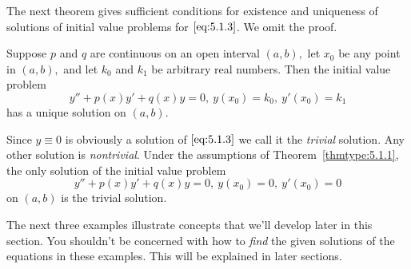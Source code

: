 \documentclass{ximera}
\begin{document}
The next theorem gives sufficient conditions for existence and
uniqueness of solutions of initial value problems for $\eqref{eq:5.1.3}$. We
omit the proof.
 
\begin{theorem} \label{thmtype:5.1.1}
Suppose $p$ and $q$ are continuous on an open interval $(a,b),$
let $x_0$ be any point in $(a,b),$ and let $k_0$ and $k_1$ be
arbitrary real numbers. Then the initial value problem
$$
y''+p(x)y'+q(x)y=0,\ y(x_0)=k_0,\ y'(x_0)=k_1
$$
 has a unique solution  on $(a,b)$.
\end{theorem}
 
Since $y\equiv0$ is obviously a solution of $\eqref{eq:5.1.3}$ we call it
the \textit{trivial} solution. Any other solution is \textit{nontrivial}.
Under the assumptions of Theorem~\ref{thmtype:5.1.1}, the only solution of
the initial value problem
$$
y''+p(x)y'+q(x)y=0,\ y(x_0)=0,\ y'(x_0)=0
$$
on  $(a,b)$ is the trivial solution.
 
The next three examples illustrate concepts that we'll develop later
in this section. You shouldn't be concerned with how to \textit{find}
the given solutions of the equations in these examples. This will be
explained in later sections.
 
\end{document}
